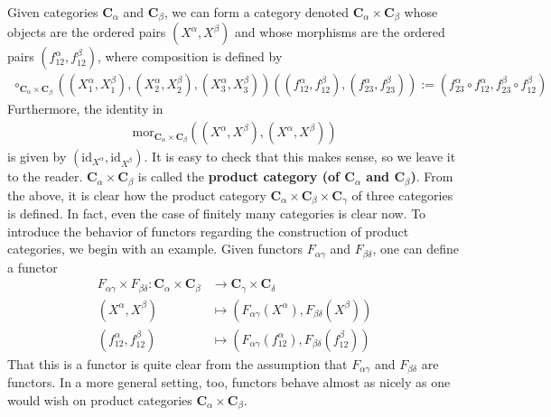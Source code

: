 Given categories $\mathbf{C}_{\alpha}$ and $\mathbf{C}_{\beta}$, we can form a category denoted $\mathbf{C}_{\alpha} \times \mathbf{C}_{\beta}$ whose objects are the ordered pairs $(X^{\alpha},X^{\beta})$ and whose morphisms are the ordered pairs $(f_{12}^{\alpha},f_{12}^{\beta})$, where composition is defined by
\begin{align*}
  \circ_{\mathbf{C}_{\alpha} \times \mathbf{C}_{\beta}}
  \left(
    (X_{1}^{\alpha},X_{1}^{\beta}),
    (X_{2}^{\alpha},X_{2}^{\beta}),
    (X_{3}^{\alpha},X_{3}^{\beta})
  \right)
  \left(
    (f_{12}^{\alpha},f_{12}^{\beta}),
    (f_{23}^{\alpha},f_{23}^{\beta})
  \right)
  :=
  \left(
    f_{23}^{\alpha}
    \circ
    f_{12}^{\alpha},
    f_{23}^{\beta}
    \circ
    f_{12}^{\beta}
  \right)
\end{align*}
Furthermore, the identity in
\begin{align*}
  \mathrm{mor}_{\mathbf{C}_{\alpha}
  \times
  \mathbf{C}_{\beta}}
  \left(
    (X^{\alpha},X^{\beta}),
    (X^{\alpha},X^{\beta})
  \right)
\end{align*}
is given by $(\mathrm{id}_{X^{\alpha}},\mathrm{id}_{X^{\beta}})$.
It is easy to check that this makes sense, so we leave it to the reader.
$\mathbf{C}_{\alpha} \times \mathbf{C}_{\beta}$ is called the \textbf{product category (of $\mathbf{C}_{\alpha}$ and $\mathbf{C}_{\beta}$)}.
From the above, it is clear how the product category $\mathbf{C}_{\alpha} \times \mathbf{C}_{\beta} \times\mathbf{C}_{\gamma}$ of three categories is defined.
In fact, even the case of finitely many categories is clear now.
To introduce the behavior of functors regarding the construction of product categories, we begin with an example.
Given functors $F_{\alpha\gamma}$ and $F_{\beta\delta}$, one can define a functor
\begin{align*}
  F_{\alpha\gamma}
  \times
  F_{\beta\delta}
  \colon
  \mathbf{C}_{\alpha}
  \times
  \mathbf{C}_{\beta}
  &\rightarrow
  \mathbf{C}_{\gamma}
  \times
  \mathbf{C}_{\delta}
  \\
  (X^{\alpha},X^{\beta})
  &\mapsto
  (F_{\alpha\gamma}(X^{\alpha}),F_{\beta\delta}(X^{\beta}))
  \\
  (f_{12}^{\alpha},f_{12}^{\beta})
  &\mapsto
  \left(
    F_{\alpha\gamma}(f_{12}^{\alpha}),
    F_{\beta\delta}(f_{12}^{\beta})
  \right)
\end{align*}
That this is a functor is quite clear from the assumption that $F_{\alpha\gamma}$ and $F_{\beta\delta}$ are functors.
In a more general setting, too, functors behave almost as nicely as one would wish on product categories $\mathbf{C}_{\alpha} \times \mathbf{C}_{\beta}$.

